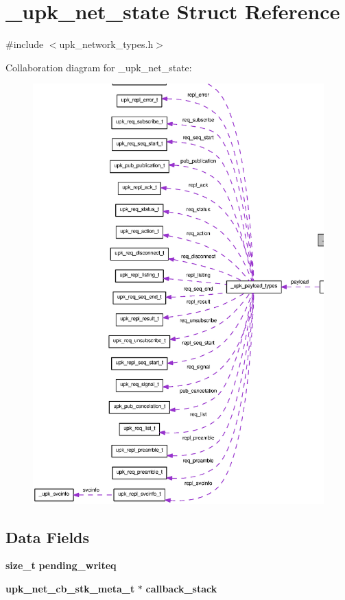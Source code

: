 \section{\_\-upk\_\-net\_\-state Struct Reference}
\label{struct__upk__net__state}


{\ttfamily \#include $<$upk\_\-network\_\-types.h$>$}



Collaboration diagram for \_\-upk\_\-net\_\-state:
\nopagebreak
\begin{figure}[H]
\begin{center}
\leavevmode
\includegraphics[width=400pt]{struct__upk__net__state__coll__graph}
\end{center}
\end{figure}
\subsection*{Data Fields}
\begin{DoxyCompactItemize}
\item 
{\bf size\_\-t} {\bf pending\_\-writeq}
\item 
{\bf upk\_\-net\_\-cb\_\-stk\_\-meta\_\-t} $\ast$ {\bf callback\_\-stack}
\end{DoxyCompactItemize}



